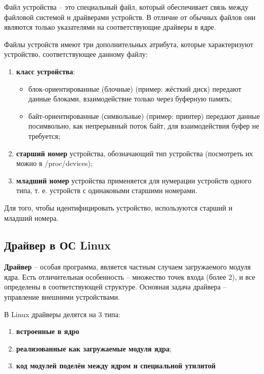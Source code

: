 Файл устройства -- это специальный файл, который обеспечивает связь между файловой системой и драйверами устройств. В отличие от обычных файлов они являются только указателями на соответствующие драйверы в ядре.

Файлы устройств имеют три дополнительных атрибута, которые характеризуют устройство, соответствующее данному файлу:
\begin{enumerate}
	\item \textbf{класс устройства}:
	\begin{itemize}
		\item блок-ориентированные (блочные) (пример: жёсткий диск) передают данные блоками, взаимодействие только через буферную память;
		\item байт-ориентированные (символьные) (пример: принтер) передают данные посимвольно, как непрерывный поток байт, для взаимодействия буфер не требуется;
	\end{itemize}

	\item \textbf{старший номер} устройства, обозначающий тип устройства (посмотреть их можно в /proc/devices);
	
	\item \textbf{младший номер} устройства применяется для нумерации устройств одного типа, т. е. устройств с одинаковыми старшими номерами.
\end{enumerate}

Для того, чтобы идентифицировать устройство, используются старший и младший номера. \cite{os} \newline

\subsection{Драйвер в ОС Linux}
\textbf{Драйвер} -- особая программа, является частным случаем загружаемого модуля ядра.  Есть отличительная особенность -- множество точек входа (более 2), и все определены в соответствующей структуре. Основная задача драйвера -- управление внешними устройствами. \cite{os}

В Linux драйверы делятся на 3 типа:
\begin{enumerate}
	\item \textbf{встроенные в ядро}
	
	\item \textbf{реализованные как загружаемые модуля ядра};
	
	\item \textbf{код модулей поделён между ядром и специальной утилитой}
\end{enumerate}

